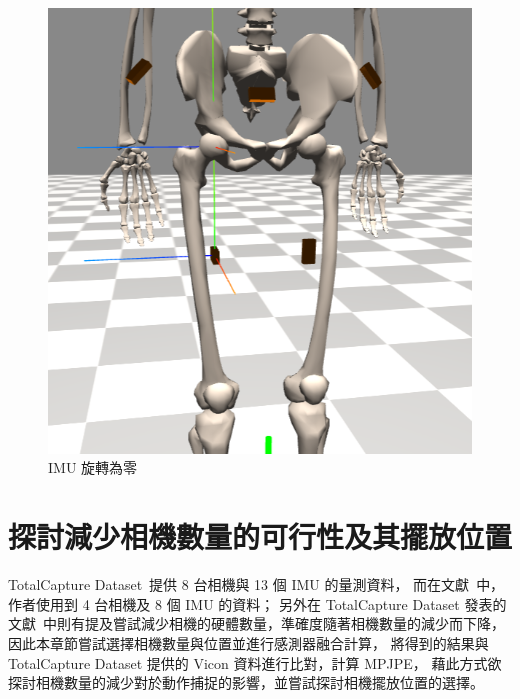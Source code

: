 \begin{figure}[!ht]
\begin{minipage}{.3\textwidth}
   \end{minipage}%
   \begin{minipage}{.3\textwidth}
      \centering
      \includegraphics[width=.8\linewidth, height=.8\linewidth]{figure/ch3_fig_imu_rot.png}
      \caption[IMU 旋轉為零]{IMU 旋轉為零}
      \label{ch3_fig_imu_rot}
    \end{minipage}
\end{figure}

\section{探討減少相機數量的可行性及其擺放位置}
TotalCapture Dataset~\cite{Trumble:BMVC:2017}提供 8 台相機與 13 個 IMU 的量測資料，
而在文獻~\cite{zhang2020fusing}中，作者使用到 4 台相機及 8 個 IMU 的資料；
另外在 TotalCapture Dataset 發表的文獻~\cite{trumble2017total}中則有提及嘗試減少相機的硬體數量，準確度隨著相機數量的減少而下降，
因此本章節嘗試選擇相機數量與位置並進行感測器融合計算，
將得到的結果與 TotalCapture Dataset 提供的 Vicon 資料進行比對，計算 MPJPE，
藉此方式欲探討相機數量的減少對於動作捕捉的影響，並嘗試探討相機擺放位置的選擇。

